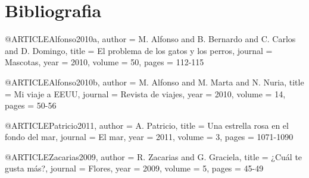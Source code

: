 \documentclass[12pt,letterpaper]{article}
\begin{document}
\newpage




\section{Bibliografia} 
@ARTICLE{Alfonso2010a,
author = {M. Alfonso and B. Bernardo and C. Carlos and D. Domingo},
title = {El problema de los gatos y los perros},
journal = {Mascotas},
year = {2010},
volume = {50},
pages = {112-115}
}

@ARTICLE{Alfonso2010b,
author = {M. Alfonso and M. Marta and N. Nuria},
title = {Mi viaje a {EEUU}},
journal = {Revista de viajes},
year = {2010},
volume = {14},
pages = {50-56}
}

@ARTICLE{Patricio2011,
author = {A. Patricio},
title = {Una estrella rosa en el fondo del mar},
journal = {El mar},
year = {2011},
volume = {3},
pages = {1071-1090}
}

@ARTICLE{Zacarias2009,
author = {R. Zacarias and G. Graciela},
title = {¿{C}uál te gusta más?},
journal = {Flores},
year = {2009},
volume = {5},
pages = {45-49}
}
\end{document}
